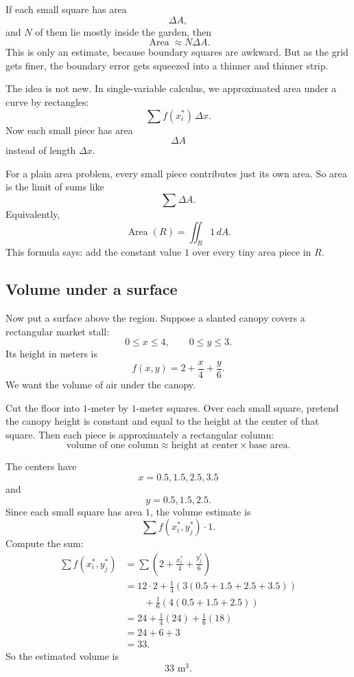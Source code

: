 If each small square has area
\[
    \Delta A,
\]
and \(N\) of them lie mostly inside the garden, then
\[
    \operatorname{Area} \approx N\Delta A.
\]
This is only an estimate, because boundary squares are awkward.  But as the grid gets
finer, the boundary error gets squeezed into a thinner and thinner strip.

The idea is not new.  In single-variable calculus, we approximated area under a curve by
rectangles:
\[
    \sum f(x_i^*)\,\Delta x.
\]
Now each small piece has area
\[
    \Delta A
\]
instead of length \(\Delta x\).

For a plain area problem, every small piece contributes just its own area.  So area is
the limit of sums like
\[
    \sum \Delta A.
\]
Equivalently,
\[
\boxed{
    \operatorname{Area}(R)=\iint_R 1\,dA.
}
\]
This formula says: add the constant value \(1\) over every tiny area piece in \(R\).

\subsection{Volume under a surface}

Now put a surface above the region.  Suppose a slanted canopy covers a rectangular
market stall:
\[
    0\le x\le 4,\qquad 0\le y\le 3.
\]
Its height in meters is
\[
    f(x,y)=2+\frac{x}{4}+\frac{y}{6}.
\]
We want the volume of air under the canopy.

Cut the floor into \(1\)-meter by \(1\)-meter squares.  Over each small square, pretend
the canopy height is constant and equal to the height at the center of that square.
Then each piece is approximately a rectangular column:
\[
    \text{volume of one column}
    \approx
    \text{height at center}\times \text{base area}.
\]

The centers have
\[
    x=0.5,1.5,2.5,3.5
\]
and
\[
    y=0.5,1.5,2.5.
\]
Since each small square has area \(1\), the volume estimate is
\[
    \sum f(x_i^*,y_j^*)\cdot 1.
\]
Compute the sum:
\[
\begin{aligned}
\sum f(x_i^*,y_j^*)
&=
\sum\left(2+\frac{x_i^*}{4}+\frac{y_j^*}{6}\right)\\
&=
12\cdot 2
+
\frac14\left(3(0.5+1.5+2.5+3.5)\right)\\
&\qquad
+
\frac16\left(4(0.5+1.5+2.5)\right)\\
&=
24+\frac14(24)+\frac16(18)\\
&=
24+6+3\\
&=
33.
\end{aligned}
\]
So the estimated volume is
\[
    33\text{ m}^3.
\]

